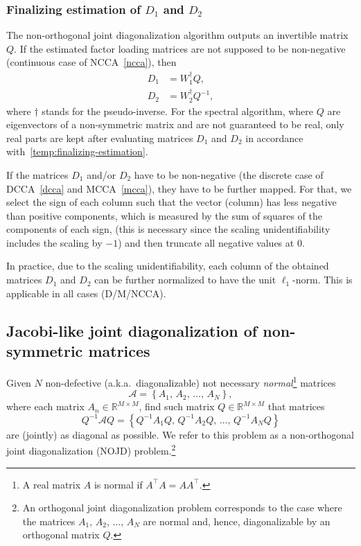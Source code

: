 \documentclass{article}
\newcommand{\cbra}[1]{\left\{#1\right\}}
\newcommand{\R}{\mathbb{R}}
\newcommand{\acal}{\mathcal{A}}
\begin{document}
\subsubsection{Finalizing estimation of $D_1$ and $D_2$}
\label{app:est-D}

The non-orthogonal joint diagonalization algorithm outputs an invertible matrix $Q$. If the estimated factor loading matrices are not supposed to be non-negative (continuous case of NCCA~\eqref{ncca}), then
\begin{equation}\label{temp:finalizing-estimation}
\begin{aligned}
D_1 &= W_1^{\dagger} Q, \\
D_2 &= W_2^{\dagger} Q^{-1},
\end{aligned}
\end{equation}
where $\dagger$ stands for the pseudo-inverse.
For the spectral algorithm, where $Q$ are eigenvectors of a non-symmetric matrix and are not guaranteed to be real, only real parts are kept after evaluating matrices $D_1$ and $D_2$ in accordance with~\eqref{temp:finalizing-estimation}.

If the matrices $D_1$ and/or $D_2$ have to be non-negative (the discrete case of DCCA~\eqref{dcca} and MCCA~\eqref{mcca}), they have to be further mapped. For that, we select the sign of each column such that the vector (column) has less negative than positive components, which is measured by the sum of squares of the components of each sign, (this is necessary since the scaling unidentifiability includes the scaling by $-1$) and then truncate all negative values at 0. 

In practice, due to the scaling unidentifiability, each column of the obtained matrices $D_1$ and $D_2$ can be further normalized to have the unit $\ell_1$-norm. This is applicable in all cases (D/M/NCCA).




\subsection{Jacobi-like joint diagonalization of non-symmetric matrices}
\label{app:nojd}

Given $N$ non-defective (a.k.a.~diagonalizable) not necessary \emph{normal}\footnote{A real matrix $A$ is normal if $A^{\top}A=AA^{\top}$.} matrices 
$$
\acal = \cbra{A_1,\, A_2,\, \dots,\, A_N},
$$ 
where each matrix $A_n\in\R^{M\times M}$, find such matrix $Q\in\R^{M\times M}$ that matrices 
$$
Q^{-1}\acal Q = \cbra{Q^{-1}A_1Q, \, Q^{-1}A_2Q,\, \dots,\,Q^{-1}A_NQ}
$$ 
are (jointly) as diagonal as possible. We refer to this problem as a non-orthogonal joint diagonalization (NOJD) problem.\footnote{An orthogonal joint diagonalization problem corresponds to the case where the matrices $A_1,\,A_2,\,\dots,\,A_N$ are normal and, hence, diagonalizable by an orthogonal matrix $Q$.} 
\end{document}
